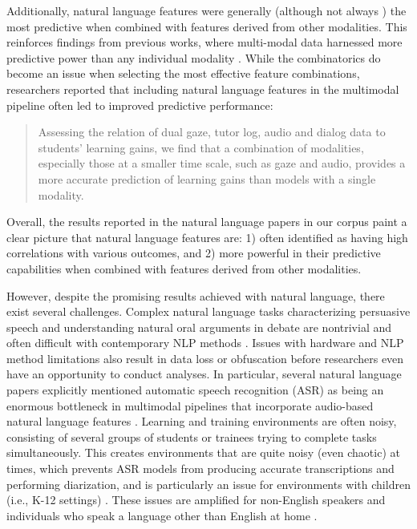 \documentclass[manuscript,screen,review]{acmart}
\begin{document}
\noindent Additionally, natural language features were generally (although not always \cite{1770989706}) the most predictive when combined with features derived from other modalities. This reinforces findings from previous works, where multi-modal data harnessed more predictive power than any individual modality \cite{sharma_multimodal_2020}. While the combinatorics do become an issue when selecting the most effective feature combinations, researchers reported that including natural language features in the multimodal pipeline often led to improved predictive performance:

\begin{quote}
    Assessing the relation of dual gaze, tutor log, audio and dialog data to students' learning gains, we find that a combination of modalities, especially those at a smaller time scale, such as gaze and audio, provides a more accurate prediction of learning gains than models with a single modality. \cite{3051560548}
\end{quote}

\noindent Overall, the results reported in the natural language papers in our corpus paint a clear picture that natural language features are: 1) often identified as having high correlations with various outcomes, and 2) more powerful in their predictive capabilities when combined with features derived from other modalities. 

However, despite the promising results achieved with natural language, there exist several challenges. Complex natural language tasks characterizing persuasive speech and understanding natural oral arguments in debate are nontrivial and often difficult with contemporary NLP methods \cite{85990093}. Issues with hardware and NLP method limitations also result in data loss or obfuscation before researchers even have an opportunity to conduct analyses. In particular, several natural language papers explicitly mentioned automatic speech recognition (ASR) as being an enormous bottleneck in multimodal pipelines that incorporate audio-based natural language features \cite{1118315889,666050348,32184286}. Learning and training environments are often noisy, consisting of several groups of students or trainees trying to complete tasks simultaneously. This creates environments that are quite noisy (even chaotic) at times, which prevents ASR models from producing accurate transcriptions and performing diarization, and is particularly an issue for environments with children (i.e., K-12 settings) \cite{32184286}. These issues are amplified for non-English speakers and individuals who speak a language other than English at home \cite{666050348}.
\end{document}
